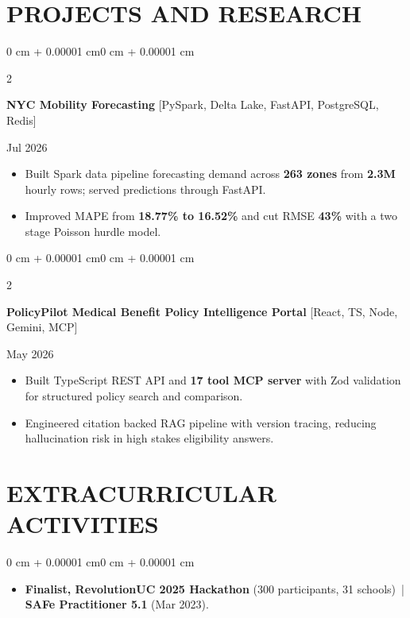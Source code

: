 \documentclass[10pt, letterpaper]{article}
\newenvironment{highlights}{
    \begin{itemize}[
        topsep=0.10 cm,
        parsep=0.06 cm,
        partopsep=0pt,
        itemsep=0.06 cm,
        leftmargin=12pt
    ]
}{
    \end{itemize}
}
\newenvironment{onecolentry}{
    \begin{adjustwidth}{0 cm + 0.00001 cm}{0 cm + 0.00001 cm}
}{
    \end{adjustwidth}
}
\newenvironment{twocolentry}[2][]{
    \onecolentry
    \def\secondColumn{#2}
    \setcolumnwidth{\fill, 4.5 cm}
    \begin{paracol}{2}
}{
    \switchcolumn \raggedleft \secondColumn
    \end{paracol}
    \endonecolentry
}
\begin{document}
\section{PROJECTS AND RESEARCH}
\begin{twocolentry}{Jul 2026}
\textbf{NYC Mobility Forecasting} [PySpark, Delta Lake, FastAPI, PostgreSQL, Redis]
\end{twocolentry}
\begin{highlights}
  \item Built Spark data pipeline forecasting demand across \textbf{263 zones} from \textbf{2.3M} hourly rows; served predictions through FastAPI.
  \item Improved MAPE from \textbf{18.77\% to 16.52\%} and cut RMSE \textbf{43\%} with a two stage Poisson hurdle model.
\end{highlights}

\vspace{0.12 cm}

\begin{twocolentry}{May 2026}
\textbf{PolicyPilot Medical Benefit Policy Intelligence Portal} [React, TS, Node, Gemini, MCP]
\end{twocolentry}
\begin{highlights}
  \item Built TypeScript REST API and \textbf{17 tool MCP server} with Zod validation for structured policy search and comparison.
  \item Engineered citation backed RAG pipeline with version tracing, reducing hallucination risk in high stakes eligibility answers.
\end{highlights}

\section{EXTRACURRICULAR ACTIVITIES}
\begin{onecolentry}
\begin{highlights}
  \item \textbf{Finalist, RevolutionUC 2025 Hackathon} (300 participants, 31 schools) \,|\, \textbf{SAFe Practitioner 5.1} (Mar 2023).
\end{highlights}
\end{onecolentry}
\end{document}
